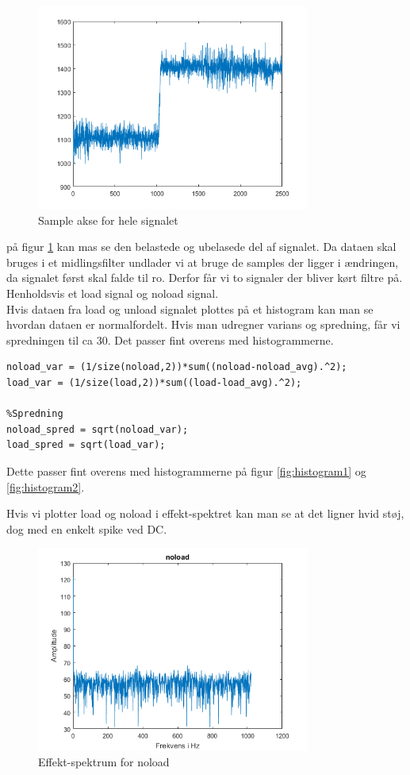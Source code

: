 \documentclass[12pt]{article}
\begin{document}
\begin{figure}[H]
	\centering
	\includegraphics[width=90mm]{Img/sample_akse.png}
	\caption{Sample akse for hele signalet}
	\label{fig:sample_akse}
\end{figure}

på figur \ref{fig:sample_akse} kan mas se den belastede og ubelasede del af signalet. Da dataen skal bruges i et midlingsfilter undlader vi at bruge de samples der ligger i ændringen, da signalet først skal falde til ro. Derfor får vi to signaler der bliver kørt filtre på. Henholdsvis et load signal og noload signal. \\
Hvis dataen fra load og unload signalet plottes på et histogram kan man se hvordan dataen er normalfordelt. Hvis man udregner varians og spredning, får vi spredningen til ca 30. Det passer fint overens med histogrammerne.

\begin{lstlisting}[frame=single]
%Varians
noload_var = (1/size(noload,2))*sum((noload-noload_avg).^2);
load_var = (1/size(load,2))*sum((load-load_avg).^2);

%Spredning
noload_spred = sqrt(noload_var);
load_spred = sqrt(load_var);
\end{lstlisting}

Dette passer fint overens med histogrammerne på figur \ref{fig:histogram1} og \ref{fig:histogram2}.

Hvis vi plotter load og noload i effekt-spektret kan man se at det ligner hvid støj, dog med en enkelt spike ved DC.

\begin{figure}[H]
	\centering
	\includegraphics[width=90mm]{Img/noload_effekt.png}
	\caption{Effekt-spektrum for noload}
	\label{fig:effekt_noload}
\end{figure}
\end{document}
